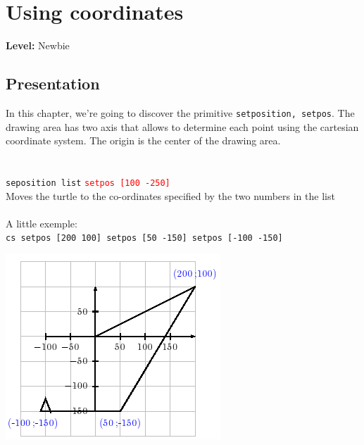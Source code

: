 \chapter{Using coordinates}
{ }\hfill\textbf{Level:} Newbie
\section{Presentation}
\noindent In this chapter, we're going to discover the primitive \texttt{setposition, setpos}. The drawing area has two axis that allows to determine each point using the cartesian coordinate system. The origin is the center of the drawing area. \\ \\ \\
\texttt{seposition list}\hspace {4cm } \textcolor{red}{ \texttt{setpos [100 -250]}}\\
 Moves the turtle to the co-ordinates specified by the two numbers in the list\\ \\
A little exemple:\\ 
\texttt{cs setpos [200 100] setpos [50 -150] setpos [-100 -150]}
\begin{center}
\includegraphics[scale=0.7]{pics/fpos-coord.png}
\end{center}
\vfill

